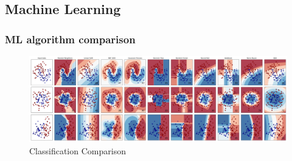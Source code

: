 \documentclass{beamer}
\begin{document}
    \subsection{Machine Learning}
    \begin{frame}
        \frametitle{ML algorithm comparison}

        \begin{figure}
            \includegraphics[width=\linewidth]{figures/ML.png}
            \caption{Classification Comparison \protect\cite{sklearn1}}
        \end{figure}
    \end{frame}
\end{document}
